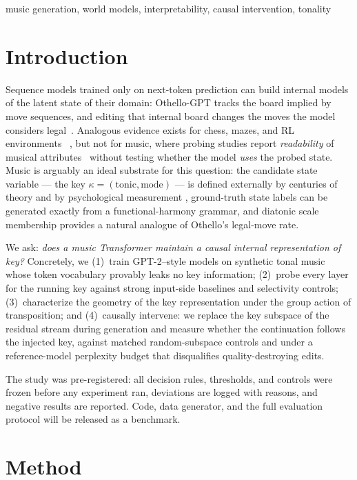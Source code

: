\documentclass[conference]{IEEEtran}
\begin{document}
\begin{IEEEkeywords}
music generation, world models, interpretability, causal intervention, tonality
\end{IEEEkeywords}

\section{Introduction}
Sequence models trained only on next-token prediction can build internal
models of the latent state of their domain: Othello-GPT tracks the board
implied by move sequences, and editing that internal board changes the moves
the model considers legal~\cite{li2023othello,nanda2023emergent}. Analogous
evidence exists for chess, mazes, and RL environments%
~\cite{mcgrath2022chess,jenner2024chess,karvonen2024chess,maze2024,iris2026},
but not for music, where probing studies report \emph{readability} of musical
attributes~\cite{syntheory2024} without testing whether the model \emph{uses}
the probed state. Music is arguably an ideal substrate for this question: the
candidate state variable --- the key $\kappa=(\text{tonic},\text{mode})$ ---
is defined externally by centuries of theory and by psychological measurement
\cite{krumhansl1982}, ground-truth state labels can be generated exactly from
a functional-harmony grammar, and diatonic scale membership provides a natural
analogue of Othello's legal-move rate.

We ask: \emph{does a music Transformer maintain a causal internal
representation of key?} Concretely, we (1)~train GPT-2--style models on
synthetic tonal music whose token vocabulary provably leaks no key
information; (2)~probe every layer for the running key against strong
input-side baselines and selectivity controls; (3)~characterize the geometry
of the key representation under the group action of transposition; and
(4)~causally intervene: we replace the key subspace of the residual stream
during generation and measure whether the continuation follows the injected
key, against matched random-subspace controls and under a reference-model
perplexity budget that disqualifies quality-destroying edits.

The study was pre-registered: all decision rules, thresholds, and controls
were frozen before any experiment ran, deviations are logged with reasons,
and negative results are reported. Code, data generator, and the full
evaluation protocol will be released as a benchmark.

\section{Method}
\end{document}
